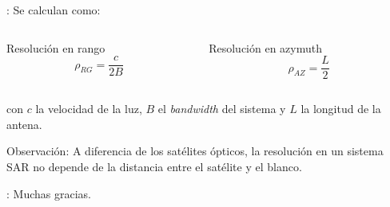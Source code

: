 \begin{frame}{\secname : \subsecname}
  Se calculan como:
    \begin{columns}
    \begin{column}{0.5\textwidth}
     \begin{block}{Resolución en rango}
      \begin{equation}
        \rho_{RG} = \frac{c}{2B}
      \end{equation}
     \end{block}
    \end{column}
    \begin{column}{0.5\textwidth}  %
      \begin{block}{Resolución en azymuth}
        \begin{equation}
          \rho_{AZ} = \frac{L}{2}
        \end{equation}
      \end{block}
    \end{column}
    \end{columns}
    con $c$ la velocidad de la luz, $B$ el \emph{bandwidth} del sistema y $L$ la longitud de la antena.

    \begin{block}{Observación:}
      A diferencia de los satélites ópticos, la resolución en un sistema SAR no depende de la distancia entre el satélite y el blanco.
    \end{block}
\end{frame}


\begin{frame}{\secname : \subsecname}
Muchas gracias.
\end{frame}
